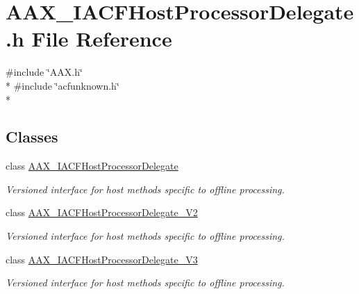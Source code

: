 \hypertarget{a00227}{}\section{A\+A\+X\+\_\+\+I\+A\+C\+F\+Host\+Processor\+Delegate.\+h File Reference}
\label{a00227}
{\ttfamily \#include \char`\"{}A\+A\+X.\+h\char`\"{}}\\*
{\ttfamily \#include \char`\"{}acfunknown.\+h\char`\"{}}\\*
\subsection*{Classes}
\begin{DoxyCompactItemize}
\item 
class \hyperlink{a00068}{A\+A\+X\+\_\+\+I\+A\+C\+F\+Host\+Processor\+Delegate}
\begin{DoxyCompactList}\small\item\em Versioned interface for host methods specific to offline processing. \end{DoxyCompactList}\item 
class \hyperlink{a00069}{A\+A\+X\+\_\+\+I\+A\+C\+F\+Host\+Processor\+Delegate\+\_\+\+V2}
\begin{DoxyCompactList}\small\item\em Versioned interface for host methods specific to offline processing. \end{DoxyCompactList}\item 
class \hyperlink{a00070}{A\+A\+X\+\_\+\+I\+A\+C\+F\+Host\+Processor\+Delegate\+\_\+\+V3}
\begin{DoxyCompactList}\small\item\em Versioned interface for host methods specific to offline processing. \end{DoxyCompactList}\end{DoxyCompactItemize}
